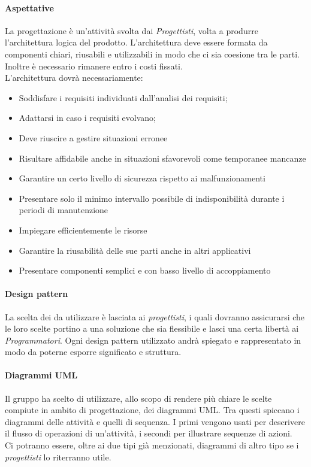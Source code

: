 \documentclass[../norme_di_progetto.tex]{subfiles}
\begin{document}
    \paragraph{Aspettative}
    La progettazione è un'attività svolta dai \emph{Progettisti}, volta a produrre l'architettura logica del prodotto. L'architettura deve essere formata da componenti chiari, riusabili e utilizzabili in modo che ci sia coesione tra le parti. Inoltre è necessario rimanere entro i costi fissati.\\
    L'architettura dovrà necessariamente: 
    \begin{itemize}
        \item Soddisfare i requisiti individuati dall'analisi dei requisiti;
        \item Adattarsi in caso i requisiti evolvano;
        \item Deve riuscire a gestire situazioni erronee
        \item Risultare affidabile anche in situazioni sfavorevoli come temporanee mancanze
        \item Garantire un certo livello di sicurezza rispetto ai malfunzionamenti
        \item Presentare solo il minimo intervallo possibile di indisponibilità durante i periodi di manutenzione
        \item Impiegare efficientemente le risorse
        \item Garantire la riusabilità delle sue parti anche in altri applicativi
        \item Presentare componenti semplici e con basso livello di accoppiamento
    \end{itemize}
 
    \paragraph{Design pattern}
    La scelta dei  da utilizzare è lasciata ai \emph{progettisti}, i quali dovranno assicurarsi che le loro scelte portino a una soluzione che sia flessibile e lasci una certa libertà ai \emph{Programmatori}. Ogni design pattern utilizzato andrà spiegato e rappresentato in modo da poterne esporre significato e struttura.

    \paragraph{Diagrammi UML}
    Il gruppo ha scelto di utilizzare, allo scopo di rendere più chiare le scelte compiute in ambito di progettazione, dei diagrammi UML. Tra questi spiccano i diagrammi delle attività e quelli di sequenza. I primi vengono usati per descrivere il flusso di operazioni di un'attività, i secondi per illustrare sequenze di azioni.\\
    Ci potranno essere, oltre ai due tipi già menzionati, diagrammi di altro tipo se i \emph{progettisti} lo riterranno utile.
\end{document}

